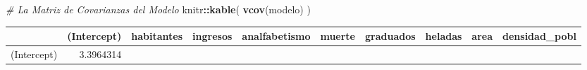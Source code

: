 \documentclass[]{article}
\newenvironment{Shaded}{\begin{snugshade}}{\end{snugshade}}
\newcommand{\KeywordTok}[1]{\textcolor[rgb]{0.13,0.29,0.53}{\textbf{#1}}}
\newcommand{\CommentTok}[1]{\textcolor[rgb]{0.56,0.35,0.01}{\textit{#1}}}
\newcommand{\OperatorTok}[1]{\textcolor[rgb]{0.81,0.36,0.00}{\textbf{#1}}}
\newcommand{\NormalTok}[1]{#1}
\begin{document}
\begin{Shaded}
\begin{Highlighting}[]
\CommentTok{# La Matriz de Covarianzas del Modelo}
\NormalTok{knitr}\OperatorTok{::}\KeywordTok{kable}\NormalTok{(}
\KeywordTok{vcov}\NormalTok{(modelo) }
\NormalTok{)}
\end{Highlighting}
\end{Shaded}

\begin{longtable}[]{@{}lrrrrrrrrr@{}}
\toprule
\begin{minipage}[b]{0.09\columnwidth}\raggedright\strut
\strut
\end{minipage} & \begin{minipage}[b]{0.07\columnwidth}\raggedleft\strut
(Intercept)\strut
\end{minipage} & \begin{minipage}[b]{0.07\columnwidth}\raggedleft\strut
habitantes\strut
\end{minipage} & \begin{minipage}[b]{0.07\columnwidth}\raggedleft\strut
ingresos\strut
\end{minipage} & \begin{minipage}[b]{0.09\columnwidth}\raggedleft\strut
analfabetismo\strut
\end{minipage} & \begin{minipage}[b]{0.07\columnwidth}\raggedleft\strut
muerte\strut
\end{minipage} & \begin{minipage}[b]{0.07\columnwidth}\raggedleft\strut
graduados\strut
\end{minipage} & \begin{minipage}[b]{0.07\columnwidth}\raggedleft\strut
heladas\strut
\end{minipage} & \begin{minipage}[b]{0.06\columnwidth}\raggedleft\strut
area\strut
\end{minipage} & \begin{minipage}[b]{0.09\columnwidth}\raggedleft\strut
densidad\_pobl\strut
\end{minipage}\tabularnewline
\midrule
\endhead
\begin{minipage}[t]{0.09\columnwidth}\raggedright\strut
(Intercept)\strut
\end{minipage} & \begin{minipage}[t]{0.07\columnwidth}\raggedleft\strut
3.3964314\strut
\end{minipage} & \begin{minipage}[t]{0.07\columnwidth}\raggedleft\strut

\end{minipage}
\end{longtable}
\end{document}
